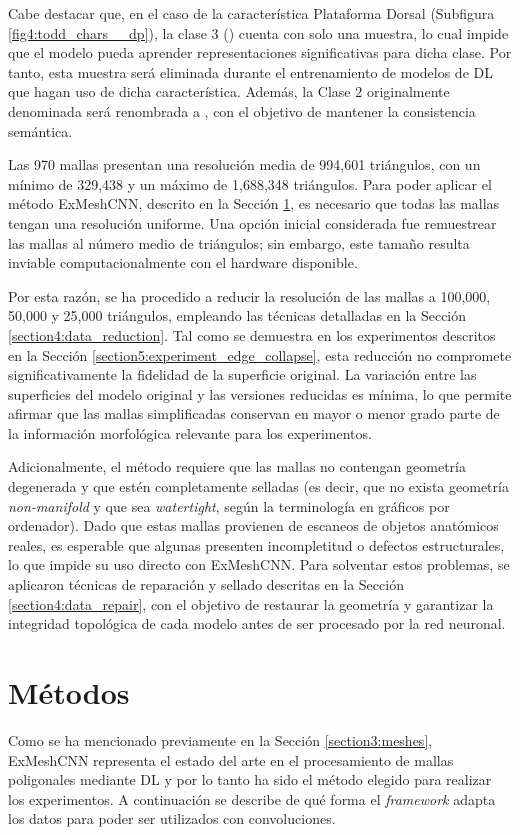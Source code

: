 Cabe destacar que, en el caso de la característica Plataforma Dorsal (Subfigura \ref{fig4:todd_chars__dp}), la clase 3 () cuenta con solo una muestra, lo cual impide que el modelo pueda aprender representaciones significativas para dicha clase. Por tanto, esta muestra será eliminada durante el entrenamiento de modelos de DL que hagan uso de dicha característica. Además, la Clase 2 originalmente denominada  será renombrada a , con el objetivo de mantener la consistencia semántica.

Las 970 mallas presentan una resolución media de 994,601 triángulos, con un mínimo de 329,438 y un máximo de 1,688,348 triángulos. Para poder aplicar el método ExMeshCNN, descrito en la Sección \ref{section4:methods}, es necesario que todas las mallas tengan una resolución uniforme. Una opción inicial considerada fue remuestrear las mallas al número medio de triángulos; sin embargo, este tamaño resulta inviable computacionalmente con el hardware disponible.

Por esta razón, se ha procedido a reducir la resolución de las mallas a 100,000, 50,000 y 25,000 triángulos, empleando las técnicas detalladas en la Sección \ref{section4:data_reduction}. Tal como se demuestra en los experimentos descritos en la Sección \ref{section5:experiment_edge_collapse}, esta reducción no compromete significativamente la fidelidad de la superficie original. La variación entre las superficies del modelo original y las versiones reducidas es mínima, lo que permite afirmar que las mallas simplificadas conservan en mayor o menor grado parte de la información morfológica relevante para los experimentos.

Adicionalmente, el método requiere que las mallas no contengan geometría degenerada y que estén completamente selladas (es decir, que no exista geometría \textit{non-manifold} y que sea \textit{watertight}, según la terminología en gráficos por ordenador). Dado que estas mallas provienen de escaneos de objetos anatómicos reales, es esperable que algunas presenten incompletitud o defectos estructurales, lo que impide su uso directo con ExMeshCNN. Para solventar estos problemas, se aplicaron técnicas de reparación y sellado descritas en la Sección \ref{section4:data_repair}, con el objetivo de restaurar la geometría y garantizar la integridad topológica de cada modelo antes de ser procesado por la red neuronal.

\section{Métodos}
\label{section4:methods}
Como se ha mencionado previamente en la Sección \ref{section3:meshes}, ExMeshCNN \cite{kim_exmeshcnn_2022} representa el estado del arte en el procesamiento de mallas poligonales mediante DL y por lo tanto ha sido el método elegido para realizar los experimentos. A continuación se describe de qué forma el \textit{framework} adapta los datos para poder ser utilizados con convoluciones.

